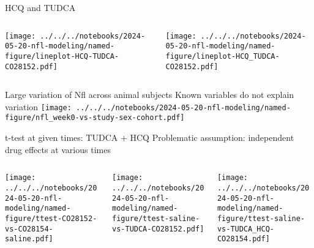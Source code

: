 \documentclass[aspectratio=169]{beamer}
\begin{document}
\begin{frame}{HCQ and TUDCA}
\begin{columns}[t]
\begin{column}{0.6\textwidth}

  \texttt{[image: ../../../notebooks/2024-05-20-nfl-modeling/named-figure/lineplot-HCQ-TUDCA-CO28152.pdf]}
\end{column}

\begin{column}{0.4\textwidth}

  \texttt{[image: ../../../notebooks/2024-05-20-nfl-modeling/named-figure/lineplot-HCQ\_TUDCA-CO28152.pdf]}
\end{column}
\end{columns}
\end{frame}


\begin{frame}{Large variation of Nfl across animal subjects}
  {Known variables do not explain variation}
  \texttt{[image: ../../../notebooks/2024-05-20-nfl-modeling/named-figure/nfl\_week0-vs-study-sex-cohort.pdf]}
\end{frame}


\begin{frame}{t-test at given times: TUDCA + HCQ}
  {Problematic assumption: independent drug effects at various times}
\begin{columns}[t]

\begin{column}{0.33\textwidth}

  \texttt{[image: ../../../notebooks/2024-05-20-nfl-modeling/named-figure/ttest-CO28152-vs-CO28154-saline.pdf]}
\end{column}

\begin{column}{0.33\textwidth}

  \texttt{[image: ../../../notebooks/2024-05-20-nfl-modeling/named-figure/ttest-saline-vs-TUDCA-CO28152.pdf]}
\end{column}

\begin{column}{0.33\textwidth}

  \texttt{[image: ../../../notebooks/2024-05-20-nfl-modeling/named-figure/ttest-saline-vs-TUDCA\_HCQ-CO28154.pdf]}
\end{column}
\end{columns}
\end{frame}
\end{document}
